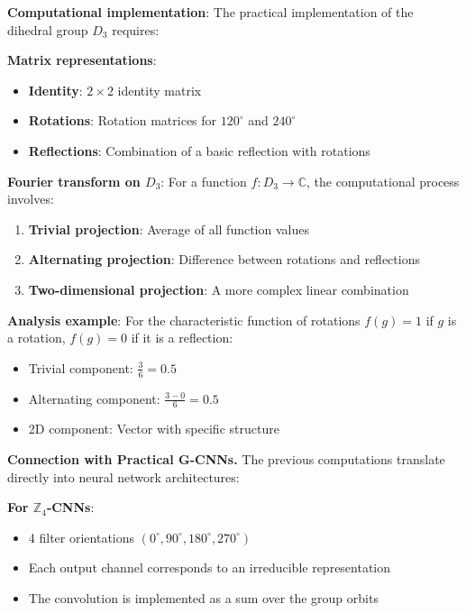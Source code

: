 \begin{example}
\textbf{Computational implementation}:
The practical implementation of the dihedral group $D_3$ requires:

\textbf{Matrix representations}:
\begin{itemize}
    \item \textbf{Identity}: $2 \times 2$ identity matrix
    \item \textbf{Rotations}: Rotation matrices for $120^\circ$ and $240^\circ$
    \item \textbf{Reflections}: Combination of a basic reflection with rotations
\end{itemize}

\textbf{Fourier transform on $D_3$}:
For a function $f: D_3 \to \mathbb{C}$, the computational process involves:
\begin{enumerate}
    \item \textbf{Trivial projection}: Average of all function values
    \item \textbf{Alternating projection}: Difference between rotations and reflections
    \item \textbf{Two-dimensional projection}: A more complex linear combination
\end{enumerate}

\textbf{Analysis example}:
For the characteristic function of rotations $f(g) = 1$ if $g$ is a rotation, $f(g) = 0$ if it is a reflection:
\begin{itemize}
    \item Trivial component: $\frac{3}{6} = 0.5$
    \item Alternating component: $\frac{3-0}{6} = 0.5$
    \item 2D component: Vector with specific structure
\end{itemize}
\end{example}

\textbf{Connection with Practical G-CNNs.} The previous computations translate directly into neural network architectures:

\textbf{For $\mathbb{Z}_4$-CNNs}:
\begin{itemize}
    \item 4 filter orientations $(0^\circ, 90^\circ, 180^\circ, 270^\circ)$
    \item Each output channel corresponds to an irreducible representation
    \item The convolution is implemented as a sum over the group orbits
\end{itemize}

